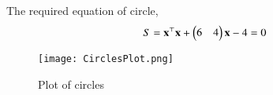 \documentclass[journal,12pt,twocolumn]{IEEEtran}
\begin{document}
The required equation of circle,
\begin{align}
    S = \mathbf{x}^\top\mathbf{x} + \begin{pmatrix}6&4\end{pmatrix}\mathbf{x} - 4 = 0
\end{align}
\begin{figure}[h!]
\centering
\texttt{[image: CirclesPlot.png]}
\caption{Plot of circles}
\label{fig:circles plot}
\end{figure}
\end{document}
